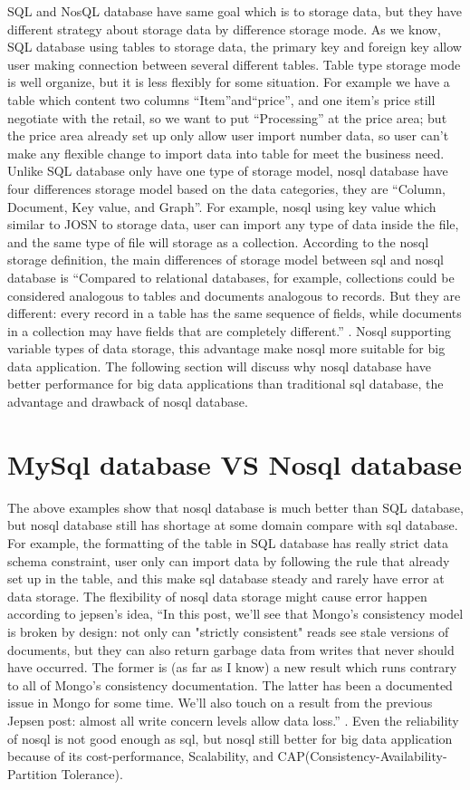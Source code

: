 \documentclass[sigconf]{acmart}
\begin{document}
SQL and NosQL database have same goal which is to storage data, but they have different strategy about storage data by difference storage mode. As we know, SQL database using tables to storage data, the primary key and foreign key allow user making connection between several different tables. Table type storage mode is well organize, but it is less flexibly for some situation. For example we have a table which content two columns ``Item''and``price'', and one item's price still negotiate with the retail, so we want to put ``Processing'' at the price area; but the price area already set up only allow user import number data, so user can't make any flexible change to import data into table for meet the business need. Unlike SQL database only have one type of storage model, nosql database have four differences storage model based on the data categories, they are ``Column, Document, Key value, and Graph''\cite{wiki:01}. For example, nosql using key value which similar to JOSN to storage data, user can import any type of data inside the file, and the same type of file will storage as a collection. According to the nosql storage definition, the main differences of storage model between sql and nosql database is ``Compared to relational databases, for example, collections could be considered analogous to tables and documents analogous to records. But they are different: every record in a table has the same sequence of fields, while documents in a collection may have fields that are completely different.'' \cite{wiki:01}. Nosql supporting variable types of data storage, this advantage make nosql more suitable for big data application. The following section will discuss why nosql database have better performance for big data applications than traditional sql database, the advantage and drawback of nosql database.
 
\section{MySql database VS Nosql database}
The above examples show that nosql database is much better than SQL database, but nosql database still has shortage at some domain compare with sql database. For example, the formatting of the table in SQL database has really strict data schema constraint, user only can import data by following the rule that already set up in the table, and this make sql database steady and rarely have error at data storage. The flexibility of nosql data storage might cause error happen according to jepsen's idea, ``In this post, we'll see that Mongo's consistency model is broken by design: not only can "strictly consistent" reads see stale versions of documents, but they can also return garbage data from writes that never should have occurred. The former is (as far as I know) a new result which runs contrary to all of Mongo's consistency documentation. The latter has been a documented issue in Mongo for some time. We'll also touch on a result from the previous Jepsen post: almost all write concern levels allow data loss.'' \cite{compare:02}. Even the reliability of nosql is not good enough as sql, but nosql still better for big data application because of its cost-performance, Scalability, and CAP(Consistency-Availability-Partition Tolerance). 
\end{document}

